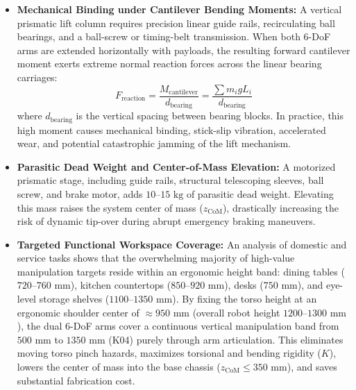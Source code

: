 \begin{itemize}[leftmargin=1.5em]
  \item \textbf{Mechanical Binding under Cantilever Bending Moments:} A vertical prismatic lift column requires precision linear guide rails, recirculating ball bearings, and a ball-screw or timing-belt transmission. When both 6-DoF arms are extended horizontally with payloads, the resulting forward cantilever moment exerts extreme normal reaction forces across the linear bearing carriages:
  \begin{equation}
    F_{\text{reaction}} = \frac{M_{\text{cantilever}}}{d_{\text{bearing}}} = \frac{\sum m_i g L_i}{d_{\text{bearing}}}
  \end{equation}
  where $d_{\text{bearing}}$ is the vertical spacing between bearing blocks. In practice, this high moment causes mechanical binding, stick-slip vibration, accelerated wear, and potential catastrophic jamming of the lift mechanism.
  \item \textbf{Parasitic Dead Weight and Center-of-Mass Elevation:} A motorized prismatic stage, including guide rails, structural telescoping sleeves, ball screw, and brake motor, adds $10\text{--}15\text{ kg}$ of parasitic dead weight. Elevating this mass raises the system center of mass ($z_{\text{CoM}}$), drastically increasing the risk of dynamic tip-over during abrupt emergency braking maneuvers.
  \item \textbf{Targeted Functional Workspace Coverage:} An analysis of domestic and service tasks shows that the overwhelming majority of high-value manipulation targets reside within an ergonomic height band: dining tables ($720\text{--}760\text{ mm}$), kitchen countertops ($850\text{--}920\text{ mm}$), desks ($750\text{ mm}$), and eye-level storage shelves ($1100\text{--}1350\text{ mm}$). By fixing the torso height at an ergonomic shoulder center of $\approx 950\text{ mm}$ (overall robot height $1200\text{--}1300\text{ mm}$), the dual 6-DoF arms cover a continuous vertical manipulation band from $500\text{ mm}$ to $1350\text{ mm}$ (K04) purely through arm articulation. This eliminates moving torso pinch hazards, maximizes torsional and bending rigidity ($K$), lowers the center of mass into the base chassis ($z_{\text{CoM}} \le 350\text{ mm}$), and saves substantial fabrication cost.
\end{itemize}

